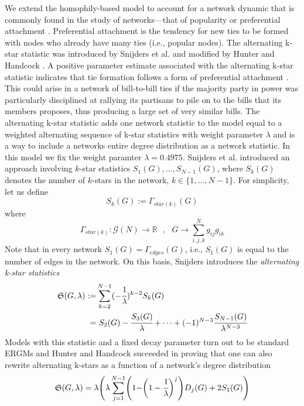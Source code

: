 \documentclass[10pt, conference, compsocconf]{IEEEtran}
\begin{document}
We extend the homophily-based model to account for a network dynamic that is commonly found in the study of networks---that of popularity or preferential attachment \cite{barabasi1999emergence}. Preferential attachment is the tendency for new ties to be formed with nodes who already have many ties (i.e., popular nodes).  The alternating k-star statistic was introduced by Snijders et al. \cite{SnijdersTomA.B..2006} and modified by Hunter and Handcock  \cite{Hunter.2006}. A positive parameter estimate associated with the alternating k-star statistic indicates that tie formation follows a form of preferential attachment \cite{SnijdersTomA.B..2006}. This could arise in a network of bill-to-bill ties if the majority party in power was particularly disciplined at rallying its partisans to pile on to the bills that its members proposes, thus producing a large set of very similar bills. The alternating k-star statistic adds one network statistic to the model equal to a weighted alternating sequence of k-star statistics with weight parameter $\lambda$ and is a way to include a networks entire degree distribution as a network statistic. In this model we fix the weight paramter $\lambda=0.4975$. 
Snijders et al. \cite{SnijdersTomA.B..2006} introduced an approach involving $k$-star statistics $S_1(G), \dots , S_{N-1}(G)$, where $S_k(G)$ denotes the number of $k$-stars in the network, $k \in \{1, \dots , N-1\}$. For simplicity, let us define
$$S_k(G):=\Gamma_{star(k)}(G) $$
where
$$\Gamma_{star(k)}: \mathcal{G}(N) \to \mathbb{R}~~~, ~~~ G \to \sum_{i,j,k}^N g_{ij}g_{ik}$$
Note that in every network $S_1(G)=\Gamma_{edges}(G)$, i.e., $S_1(G)$ is equal to the number of edges in the network.
On this basis, Snijders introduces the \textit{alternating k-star statistics}
\begin{equation*}
\begin{split}
\mathfrak{S}(G,\lambda):= & \sum_{k=2}^{N-1}(-\cfrac{1}{\lambda})^{k-2}S_k(G)\\= & ~   S_2(G)-\cfrac{S_3(G)}{\lambda}+ \dots + (-1)^{N-3}\cfrac{S_{N-1}(G)}{\lambda^{N-3}}
\end{split}
\end{equation*} 
Models with this statistic and a fixed decay parameter turn out to be standard ERGMs and Hunter and Handcock \cite{Hunter.2006} succeeded in proving that one can also rewrite alternating k-stars as a function of a network's degree distribution
\begin{equation}
\mathfrak{S}(G,\lambda)= \lambda\Biggr(\lambda\sum_{j=1}^{N-1}\Biggr( 1-\biggr(1-\cfrac{1}{\lambda}\biggl)^j\Biggl)D_j(G) + 2S_1(G)\Biggl)
\label{alto}
\end{equation}
\end{document}
